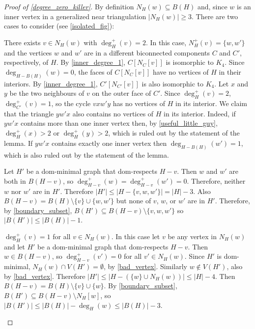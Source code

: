 \documentclass[a4paper,UKenglish,cleveref, autoref, thm-restate]{lipics-v2021}
\begin{document}
\begin{proof}[Proof of \cref{degree_zero_killer}]
  By definition $N_H(w)\subseteq B(H)$ and, since $w$ is an inner vertex in a generalized near triangulation $|N_H(w)|\ge 3$. There are two cases to consider (see \cref{isolated_fig}):
  \begin{compactenum}[(a)]
    \item There exists $v\in N_H(w)$ with $\deg^+_H(v)=2$. In this case, $N^+_H(v)=\{w,w'\}$ and the vertices $w$ and $w'$ are in a different biconnected components $C$ and $C'$, respectively, of $H$. By \cref{inner_degree_1}, $C[N_C[v]]$ is isomorphic to $K_4$. Since $\deg_{H-B(H)}(w)=0$, the faces of $C[N_C[v]]$ have no vertices of $H$ in their interiors.   By \cref{inner_degree_1}, $C'[N_{C'}[v]]$ is also isomorphic to $K_4$.  Let $x$ and $y$ be the two neighbours of $v$ on the outer face of $C'$. Since $\deg^+_H(v)=2$, $\deg_{C'}^+(v)=1$, so the cycle $vxw'y$ has no vertices of $H$ in its interior.
    We claim that the triangle $yw'x$ also contains no vertices of $H$ in its interior. Indeed, if $yw'x$ contains more than one inner vertex then, by \cref{useful_little_guy}, $\deg^+_H(x)>2$ or $\deg^+_H(y)>2$, which is ruled out by the statement of the lemma.  If $yw'x$ contains exactly one inner vertex then $\deg_{H-B(H)}(w')=1$, which is also ruled out by the statement of the lemma.

    Let $H'$ be a dom-minimal graph that dom-respects $H-v$. Then $w$ and $w'$ are both in $B(H-v)$, so $\deg^+_{H-v}(w)=\deg^+_{H-v}(w')=0$. Therefore, neither $w$ nor $w'$ are in $H'$. Therefore $|H'|\le |H-\{v,w,w'\}|=|H|-3$.  Also $B(H-v)=B(H)\setminus\{v\}\cup\{w,w'\}$ but none of $v$, $w$, or $w'$ are in $H'$.  Therefore, by \cref{boundary_subset}, $B(H')\subseteq B(H-v)\setminus\{v,w,w'\}$ so $|B(H')|\le |B(H)|-1$.

    \item $\deg^+_H(v)=1$ for all $v\in N_H(w)$.  In this case let $v$ be any vertex in $N_H(w)$ and let $H'$ be a dom-minimal graph that dom-respects $H-v$.  Then $w\in B(H-v)$, so $\deg^+_{H-v}(v')=0$ for all $v'\in N_H(w)$. Since $H'$ is dom-minimal, $N_H(w)\cap V(H')=\emptyset$, by \cref{bad_vertex}.  Similarly $w\not\in V(H')$, also by \cref{bad_vertex}. Therefore $|H'|\le |H-(\{w\}\cup N_H(w))| \le |H|-4$. Then $B(H-v)=B(H)\setminus\{v\}\cup\{w\}$.
    By \cref{boundary_subset}, $B(H')\subseteq B(H-v)\setminus N_H[w]$, so $|B(H')|\le |B(H)|-\deg_H(w) \le |B(H)|-3$. \qedhere
  \end{compactenum}
\end{proof}
\end{document}
